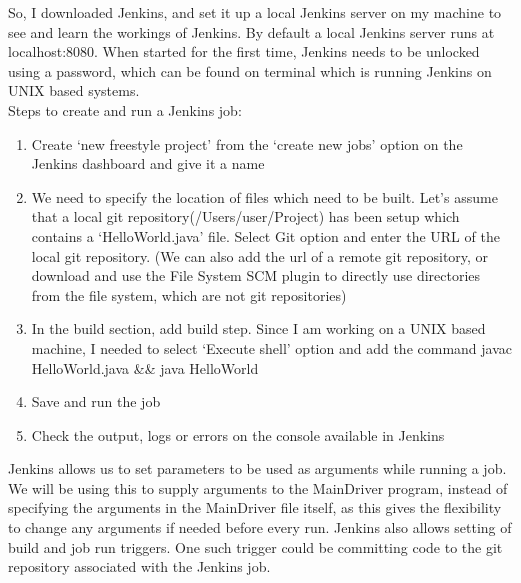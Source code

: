\documentclass[a4paper,12pt]{article}
\begin{document}
So, I downloaded Jenkins, and set it up a local Jenkins server on my machine to see and learn the workings of Jenkins. By default a local Jenkins server runs at localhost:8080. When started for the first time, Jenkins needs to be unlocked using a password, which can be found on terminal which is running Jenkins on UNIX based systems.\\

Steps to create and run a Jenkins job:
\begin{enumerate}
	\item Create `new freestyle project' from the `create new jobs' option on the Jenkins dashboard and give it a name
	\item We need to specify the location of files which need to be built. Let's assume that a local git repository(/Users/user/Project) has been setup which contains a `HelloWorld.java' file. Select Git option and enter the URL of the local git repository. (We can also add the url of a remote git repository, or download and use the File System SCM plugin to directly use directories from the file system, which are not git repositories)
	\item In the build section, add build step. Since I am working on a UNIX based machine, I needed to select `Execute shell' option and add the command javac HelloWorld.java \&\& java HelloWorld
	\item Save and run the job
	\item Check the output, logs or errors on the console available in Jenkins
\end{enumerate}
Jenkins allows us to set parameters to be used as arguments while running a job. We will be using this to supply arguments to the MainDriver program, instead of specifying the arguments in the MainDriver file itself, as this gives the flexibility to change any arguments if needed before every run. Jenkins also allows setting of build and job run triggers. One such trigger could be committing code to the git repository associated with the Jenkins job.
\end{document}
